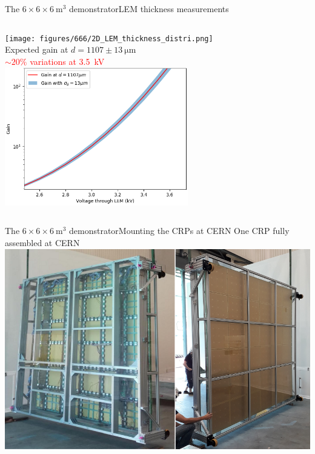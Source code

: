 \documentclass[10pt]{beamer}
\begin{document}
\begin{frame}{The \texorpdfstring{$6 \times 6 \times \SI{6}{\meter\cubed}$}{666} demonstrator}{LEM thickness measurements}
\begin{scriptsize}
\begin{columns}
\begin{column}{0.48\textwidth}
    				\texttt{[image: figures/666/2D\_LEM\_thickness\_distri.png]}\\
    				\vfill
    				\centering
    				Expected gain at $d=1107\pm\SI{13}{\micro\meter}$\\
    				\textcolor{red}{$\sim 20\%$ variations at \SI{3.5}{\kilo\volt}}\\
    				\includegraphics[width=0.6\textwidth]{figures/666/measured_gain_fluctuations.png}
    			\end{column}
    		\end{columns}
    	\end{scriptsize}
    \end{frame}
    
    \begin{frame}{The \texorpdfstring{$6 \times 6 \times \SI{6}{\meter\cubed}$}{666} demonstrator}{Mounting the CRPs at CERN}
    	\centering One CRP fully assembled at CERN\\
    	\vfill
    		\includegraphics[width=\textwidth]{figures/666/crp_top_bottom.png}
    \end{frame}
    
\end{document}
